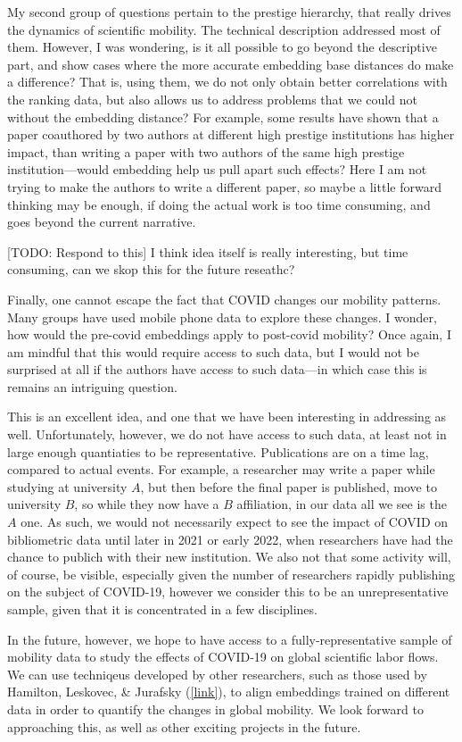 \documentclass[12pt,a4paper]{article}
\newcommand{\todo}[1]{{\leavevmode\color{orange}[TODO: #1]}}
\newcommand{\response}[1]{{\leavevmode\noindent #1}}
\newcommand{\rcomment}[1]{%
\vspace{10pt}
\begin{tcolorbox}[colback=black!3,colframe=white!45!black]
#1
\end{tcolorbox}
}
\begin{document}
\rcomment{
  My second group of questions pertain to the prestige hierarchy, that really drives the dynamics of scientific mobility. The technical description addressed most of them. However, I was wondering, is it all possible to go beyond the descriptive part, and show cases where the more accurate embedding base distances do make a difference? That is, using them, we do not only obtain better correlations with the ranking data, but also allows us to address problems that we could not without the embedding distance? For example, some results have shown that a paper coauthored by two authors at different high prestige institutions has higher impact, than writing a paper with two authors of the same high prestige institution—would embedding help us pull apart such effects? Here I am not trying to make the authors to write a different paper, so maybe a little forward thinking may be enough, if doing the actual work is too time consuming, and goes beyond the current narrative.
}

\response{
\todo{Respond to this}
 	I think idea itself is really interesting, but time consuming, can we skop this for the future reseathc?

}


\rcomment{
Finally, one cannot escape the fact that COVID changes our mobility patterns. Many groups have used mobile phone data to explore these changes. I wonder, how would the pre-covid embeddings apply to post-covid mobility? Once again, I am mindful that this would require access to such data, but I would not be surprised at all if the authors have access to such data—in which case this is remains an intriguing question.
}

\response{
This is an excellent idea, and one that we have been interesting in addressing as well. 
Unfortunately, however, we do not have access to such data, at least not in large enough quantiaties to be representative. 
Publications are on a time lag, compared to actual events.
For example, a researcher may write a paper while studying at university $A$, but then before the final paper is published, move to university $B$, so while they now have a $B$ affiliation, in our data all we see is the $A$ one. 
As such, we would not necessarily expect to  see the impact of COVID on bibliometric data until later in 2021 or early 2022, when researchers have had the chance to publich with their new institution.
We also not that some activity will, of course, be visible, especially given the number of researchers rapidly publishing on the subject of COVID-19, however we consider this to be an unrepresentative sample, given that it is concentrated in a few disciplines.  

In the future, however, we hope to have access to a fully-representative sample of mobility data to study the effects of COVID-19 on global scientific labor flows. 
We can use techniqeus developed by other researchers, such as those used by Hamilton, Leskovec, \& Jurafsky (\href{https://nlp.stanford.edu/projects/histwords/}{[link]}), to align embeddings trained on different data in order to quantify the changes in global mobility. 
We look forward to approaching this, as well as other exciting projects in the future. 
}
\end{document}
